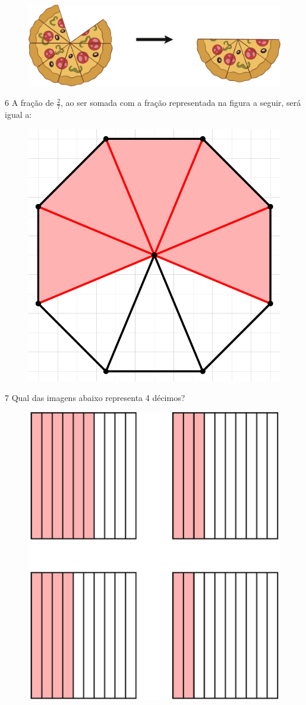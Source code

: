 \begin{figure}[htpb!]
\centering
\includegraphics[width=\textwidth]{./ilustras-mat/modulo_3-atividade_5.png}
\end{figure}


\pagebreak
\num{6} A fração de $\frac{2}{7}$, ao ser somada com a fração
representada na figura a seguir, será igual a:

\begin{figure}[htpb!]
\centering
\includegraphics[width=.5\textwidth]{./tikz/004.pdf}
\end{figure}

\begin{emptybox}
\end{emptybox}

\num{7} Qual das imagens abaixo representa 4 décimos?

\begin{figure}[htpb!]
\centering
\includegraphics[width=.5\textwidth]{./tikz/005.pdf}
\end{figure}


